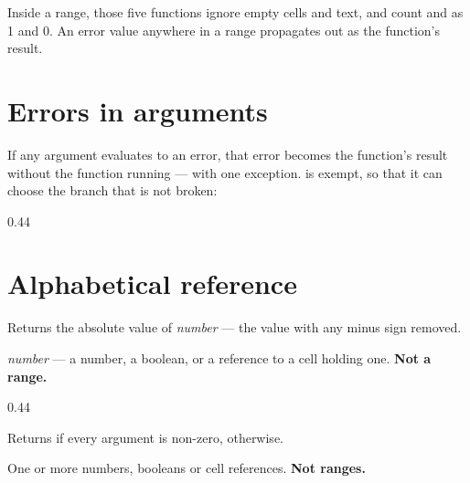 Inside a range, those five functions ignore empty cells and text, and count
 and  as 1 and 0. An error value anywhere in a range
propagates out as the function's result.

\section{Errors in arguments}

If any argument evaluates to an error, that error becomes the function's result
without the function running --- with one exception.  is exempt, so that
it can choose the branch that is not broken:

\begin{ccexamples}[]{0.44\linewidth}
\end{ccexamples}

\section{Alphabetical reference}


Returns the absolute value of \emph{number} --- the value with any minus sign
removed.

\begin{ccsteps}
\item \emph{number} --- a number, a boolean, or a reference to a cell holding
one. \textbf{Not a range.}
\end{ccsteps}

\begin{ccexamples}{0.44\linewidth}
\end{ccexamples}


Returns  if every argument is non-zero,  otherwise.

\begin{ccsteps}
\item One or more numbers, booleans or cell references. \textbf{Not ranges.}
\end{ccsteps}

